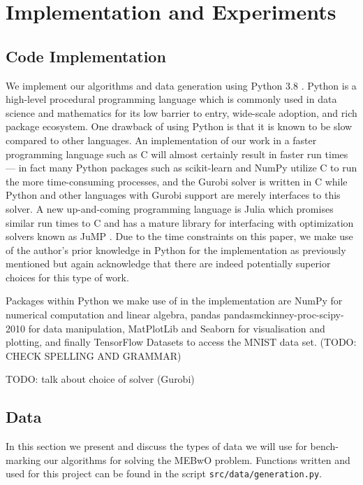 \documentclass[11pt,twoside]{report}
\theoremstyle{definition}
\numberwithin{theorem}{section}
\numberwithin{definition}{section}
\numberwithin{lemma}{section}
\numberwithin{proposition}{section}
\numberwithin{equation}{section}
\numberwithin{figure}{section}
\begin{document}
\chapter{Implementation and Experiments}\label{implementation}
\section{Code Implementation}
We implement our algorithms and data generation using Python 3.8 \cite{python}. Python is a high-level procedural programming language which is commonly used in data science and mathematics for its low barrier to entry, wide-scale adoption, and rich package ecosystem. One drawback of using Python is that it is known to be slow compared to other languages. An implementation of our work in a faster programming language such as C \cite{kernighan2006c} will almost certainly result in faster run times --- in fact many Python packages such as scikit-learn \cite{scikit-learn} and NumPy \cite{numpy} utilize C to run the more time-consuming processes, and the Gurobi \cite{gurobi} solver is written in C while Python and other languages with Gurobi support are merely interfaces to this solver. A new up-and-coming programming language is Julia \cite{bezanson2017julia} which promises similar run times to C and has a mature library for interfacing with optimization solvers known as JuMP \cite{jump}. Due to the time constraints on this paper, we make use of the author's prior knowledge in Python for the implementation as previously mentioned but again acknowledge that there are indeed potentially superior choices for this type of work.

Packages within Python we make use of in the implementation are NumPy \cite{numpy} for numerical computation and linear algebra, pandas \cite{pandasjeff_reback_2021_5060318}{pandasmckinney-proc-scipy-2010} for data manipulation, MatPlotLib \cite{matplotlib} and Seaborn \cite{seaborn} for visualisation and plotting, and finally TensorFlow Datasets \cite{TFDS} to access the MNIST \cite{lecun2010mnist} data set. (TODO: CHECK SPELLING AND GRAMMAR)

TODO: talk about choice of solver (Gurobi)

\section{Data}\label{data}
In this section we present and discuss the types of data we will use for bench-marking our algorithms for solving the MEBwO problem. Functions written and used for this project can be found in the script \texttt{src/data/generation.py}.
\end{document}
